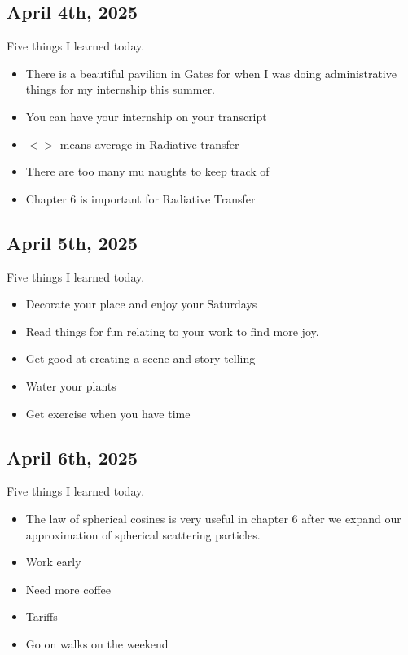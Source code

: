 \documentclass{article}
\begin{document}
\subsection{April 4th, 2025}

Five things I learned today. 

\begin{itemize}
    \item There is a beautiful pavilion in Gates for when I was doing administrative things for my internship this summer. 
    \item You can have your internship on your transcript 
    \item $<>$ means average in Radiative transfer
    \item There are too many mu naughts to keep track of
    \item Chapter 6 is important for Radiative Transfer
\end{itemize}

\subsection{April 5th, 2025}

Five things I learned today. 

\begin{itemize}
    \item Decorate your place and enjoy your Saturdays
    \item Read things for fun relating to your work to find more joy. 
    \item Get good at creating a scene and story-telling
    \item Water your plants 
    \item Get exercise when you have time
\end{itemize}


\subsection{April 6th, 2025}

Five things I learned today. 

\begin{itemize}
    \item The law of spherical cosines is very useful in chapter 6 after we expand our approximation of spherical scattering particles. 
    \item Work early
    \item Need more coffee 
    \item Tariffs 
    \item Go on walks on the weekend
\end{itemize}
\end{document}
